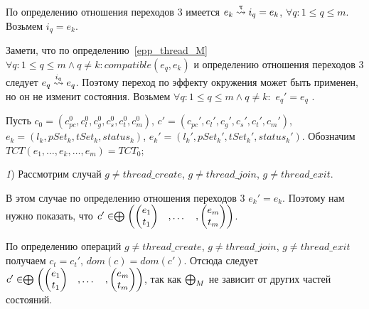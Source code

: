 По определению отношения переходов 3 имеется $e_k \stackrel{\uptau}{\leadsto} i_q=e_k$, $\forall q: 1 \le q \le m$. Возьмем $i_q=e_k$.

Замети, что по определению~\ref{epp_thread_M} $\forall q: 1 \le q \le m \land q \neq k: compatible(e_q, e_k)$ и определению отношения переходов 3 следует $e_q \stackrel{i_q}{\leadsto} e_q$. 
Поэтому переход по эффекту окружения может быть применен, но он не изменит состояния.
Возьмем $\forall q: 1 \le q \le m \land q \neq k:$ $e_q' = e_q$ .

Пусть $c_0 = (c_{pc}^0, c_l^0, c_g^0, c_s^0, c^0_t, c^0_m)$, $c' = (c_{pc}', c_l', c_g', c_s', c_t', c_m')$, $e_k=(l_k, pSet_k, tSet_k, status_k)$, $e_k'=(l_k', pSet_k', tSet_k', status_k')$.
Обозначим $TCT(e_1, \dots, e_k, \dots, e_m) = TCT_0$;

{\textit 1)} Рассмотрим случай $g \neq thread\_create$, $g \neq thread\_join$, $g \neq thread\_exit$.

В этом случае по определению отношения переходов 3 $e_k' = e_k$. Поэтому нам нужно показать, что
$c' \in \mathrel{\bigoplus}
\begin{pmatrix}
\begin{pmatrix}
e_1 \\
t_1 
\end{pmatrix}& ,
\dots& ,
\begin{pmatrix}
e_m \\
t_m 
\end{pmatrix}
\end{pmatrix}$.

По определению операций $g \neq thread\_create$, $g \neq thread\_join$, $g \neq thread\_exit$ получаем $c_t = c_t'$, $dom(c) = dom(c')$. Отсюда следует $c' \in \mathrel{\bigoplus}
\begin{pmatrix}
\begin{pmatrix}
e_1 \\
t_1 
\end{pmatrix}& ,
\dots& ,
\begin{pmatrix}
e_m \\
t_m 
\end{pmatrix}
\end{pmatrix}$, так как $\mathrel{\bigoplus}_M$ не зависит от других частей состояний.

